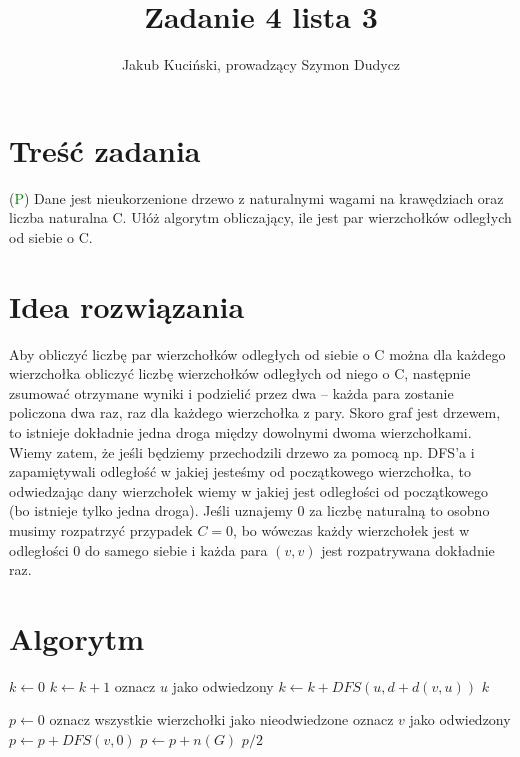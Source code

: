 \documentclass{article}
\title{Zadanie 4 lista 3}
\author{Jakub Kuciński, prowadzący Szymon Dudycz}
\begin{document}
\maketitle

\tableofcontents

\section{Treść zadania}
(\textcolor{green}{P}) Dane jest nieukorzenione drzewo z naturalnymi wagami na krawędziach oraz liczba naturalna C. Ułóż algorytm obliczający, ile jest par wierzchołków odległych od siebie o C.

\section{Idea rozwiązania}
Aby obliczyć liczbę par wierzchołków odległych od siebie o C można dla każdego wierzchołka obliczyć liczbę wierzchołków odległych od niego o C, następnie zsumować otrzymane wyniki i podzielić przez dwa -- każda para zostanie policzona dwa raz, raz dla każdego wierzchołka z pary. Skoro graf jest drzewem, to istnieje dokładnie jedna droga między dowolnymi dwoma wierzchołkami. Wiemy zatem, że jeśli będziemy przechodzili drzewo za pomocą np. DFS'a i zapamiętywali odległość w jakiej jesteśmy od początkowego wierzchołka, to odwiedzając dany wierzchołek wiemy w jakiej jest odległości od początkowego (bo istnieje tylko jedna droga). Jeśli uznajemy 0 za liczbę naturalną to osobno musimy rozpatrzyć przypadek $C = 0$, bo wówczas każdy wierzchołek jest w odległości 0 do samego siebie i każda para $(v, v)$ jest rozpatrywana dokładnie raz.

\newpage
\section{Algorytm}
\begin{algorithm}
\caption{$DFS(v, d)$}
\begin{algorithmic}[1]
\State $k \leftarrow 0$
    \State $k\leftarrow k + 1$
\EndIf
{}
        \State oznacz $u$ jako odwiedzony
            \State $k\leftarrow k + DFS(u, d+d(v,u))$
        \EndIf
    \EndIf
\EndFor
\Return $k$
\end{algorithmic}
\end{algorithm}

\begin{algorithm}
\caption{$Algorytm$}
\begin{algorithmic}[1]
\State $p\leftarrow 0$
    \State oznacz wszystkie wierzchołki jako nieodwiedzone
    \State oznacz $v$ jako odwiedzony
    \State $p \leftarrow p + DFS(v, 0)$
\EndFor
{}
    \State $p \leftarrow p + n(G)$
\EndIf
\Return $p/2$
\end{algorithmic}
\end{algorithm}
\end{document}
